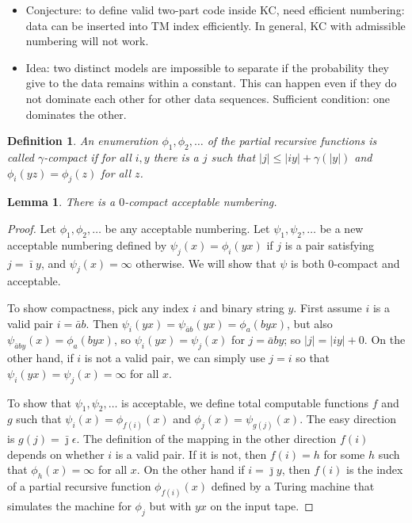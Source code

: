 \documentclass{article}
\newtheorem{lemma}[theorem]{Lemma}
\newtheorem{definition}{Definition}
\begin{document}
\begin{itemize}
\item Conjecture: to define valid two-part code inside KC, need efficient numbering: data can be inserted into TM index efficiently. In general, KC with admissible numbering will not work.

\item Idea: two distinct models are impossible to separate if the probability they give to the data remains within a constant. This can happen even if they do not dominate each other for other data sequences. Sufficient condition: one dominates the other.
\end{itemize}

\begin{definition} An enumeration $\phi_1,\phi_2,\ldots$ of the partial recursive functions is called \emph{$\gamma$-compact} if for all $i,y$ there is a $j$ such that $|j|\le|i y|+\gamma(|y|)$ and $\phi_i(y z)=\phi_j(z)$ for all $z$.
\end{definition}

\begin{lemma}
There is a $0$-compact acceptable numbering.
\end{lemma}
\begin{proof}
  Let $\phi_1,\phi_2,\ldots$ be any acceptable numbering. Let $\psi_1,\psi_2,\ldots$ be a new acceptable numbering defined by $\psi_j(x)=\phi_i(y x)$ if $j$ is a pair satisfying $j=\bar\imath y$, and $\psi_j(x)=\infty$ otherwise.  We will show that $\psi$ is both $0$-compact and acceptable. 

To show compactness, pick any index $i$ and binary string $y$. First assume $i$ is a valid pair $i=\bar a b$. Then  $\psi_i(y x) = \psi_{\bar a b}(y x)=\phi_a(b y x)$, but also $\psi_{\bar a b y}(x)=\phi_a(b y x)$, so $\psi_i(y x) = \psi_j(x)$ for $j=\bar a b y$; so $|j|=|iy|+0$. On the other hand, if $i$ is not a valid pair, we can simply use $j=i$ so that $\psi_i(y x)=\psi_j(x)=\infty$ for all $x$.

To show that $\psi_1,\psi_2,\ldots$ is acceptable, we define total computable functions $f$ and $g$ such that $\psi_i(x)=\phi_{f(i)}(x)$ and $\phi_j(x)=\psi_{g(j)}(x)$. The easy direction is $g(j)=\bar\jmath\epsilon$. The definition of the mapping in the other direction $f(i)$ depends on whether $i$ is a valid pair. If it is not, then $f(i)=h$ for some $h$ such that $\phi_h(x)=\infty$ for all $x$. On the other hand if $i=\bar\jmath y$, then $f(i)$ is the index of a partial recursive function $\phi_{f(i)}(x)$ defined by a Turing machine that simulates the machine for $\phi_j$ but with $yx$ on the input tape.
\end{proof}
\end{document}

